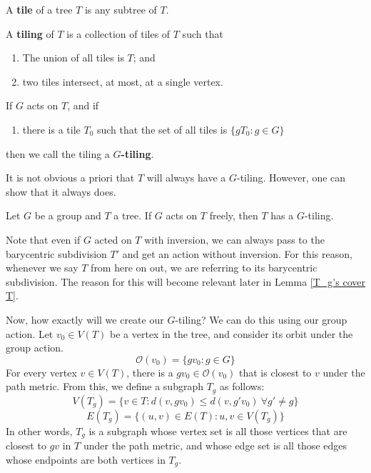 \begin{defn}
    A \textbf{tile} of a tree $T$ is any subtree of $T$. 

    A \textbf{tiling} of $T$ is a collection of tiles of $T$ such that 

    \begin{enumerate}
        \item The union of all tiles is $T$; and
        \item two tiles intersect, at most, at a single vertex.
    \end{enumerate}

    \noindent If $G$ acts on $T$, and if 

    \begin{enumerate}
        \item[3.] there is a tile $T_0$ such that the set of all tiles is $\{gT_0: g \in G\}$
    \end{enumerate}

    \noindent then we call the tiling a \textbf{$G$-tiling}.
\end{defn}

It is not obvious a priori that $T$ will always have a $G$-tiling. However, one can show that it always does. 

\begin{thm}\label{Groups Acting on Trees have G-Tilings}
    Let $G$ be a group and $T$ a tree. If $G$ acts on $T$ freely, then $T$ has a $G$-tiling. 
\end{thm}

Note that even if $G$ acted on $T$ with inversion, we can always pass to the barycentric subdivision $T'$ and get an action without inversion. For this reason, whenever we say $T$ from here on out, we are referring to its barycentric subdivision. The reason for this will become relevant later in Lemma \ref{T_g's cover T}.

Now, how exactly will we create our $G$-tiling? We can do this using our group action. Let $v_0 \in V(T)$ be a vertex in the tree, and consider its orbit under the group action.
\[ \mathcal{O}(v_0) = \{gv_0 : g \in G\} \]
For every vertex $v \in V(T)$, there is a $gv_0 \in \mathcal{O}(v_0)$ that is closest to $v$ under the path metric. From this, we define a subgraph $T_g$ as follows:
\[ V(T_g) = \{v \in T : d(v,gv_0) \leq d(v,g'v_0) \ \forall g' \neq g\} \]
\[ E(T_g) = \{(u,v) \in E(T) : u,v \in V(T_g)\} \]
In other words, $T_g$ is a subgraph whose vertex set is all those vertices that are closest to $gv$ in $T$ under the path metric, and whose edge set is all those edges whose endpoints are both vertices in $T_g$. 

